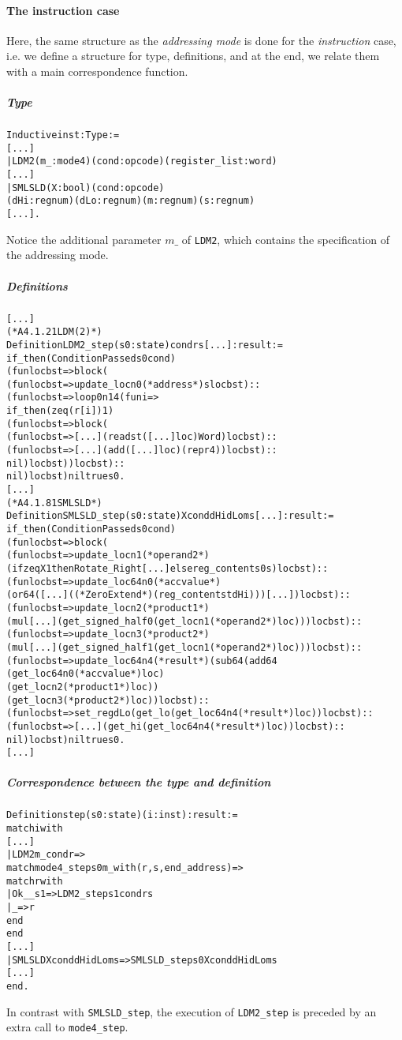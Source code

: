 \documentclass[a4paper, 11pt]{article}
\newenvironment{coq}
  {%
   \begin{alltt}
   \footnotesize} %% 8.3pl2 (April 2011)
  {\end{alltt} %
  }
\begin{document}
\paragraph{The instruction case}
Here, the same structure as the \emph{addressing mode} is done for the \emph{instruction} case, i.e. we define a structure for type, definitions, and at the end, we relate them with a main correspondence function.
  \subparagraph{Type}
\begin{coq}
Inductive inst : Type := 
[...]
  | LDM2 (m_ : mode4) (cond : opcode) (register_list : word) 
[...]
  | SMLSLD (X : bool) (cond : opcode) 
      (dHi : regnum) (dLo : regnum) (m : regnum) (s : regnum)
[...].
\end{coq}
Notice the additional parameter $m\_$ of {\tt LDM2}, which contains the specification of the addressing mode.
  \subparagraph{Definitions}
\begin{coq}
[...]
(* A4.1.21 LDM (2) *)
Definition LDM2_step (s0 : state) cond r s [...] : result :=
  if_then (ConditionPassed s0 cond)
    (fun loc b st => block (
      (fun loc b st => update_loc n0 (*address*) s loc b st) ::
      (fun loc b st => loop 0 n14 (fun i => 
        if_then (zeq (r[i]) 1)
          (fun loc b st => block (
            (fun loc b st => [...] (read st ([...] loc) Word) loc b st) ::
            (fun loc b st => [...] (add ([...] loc) (repr 4)) loc b st) ::
            nil) loc b st)) loc b st) ::
      nil) loc b st) nil true s0.
[...]
(* A4.1.81 SMLSLD *)
Definition SMLSLD_step (s0 : state) X cond dHi dLo m s [...] : result :=
  if_then (ConditionPassed s0 cond)
    (fun loc b st => block (
      (fun loc b st => update_loc n1 (*operand2*) 
        (if zeq X 1 then Rotate_Right [...] else reg_content s0 s) loc b st) ::
      (fun loc b st => update_loc64 n0 (*accvalue*) 
        (or64 ([...] ((*ZeroExtend*)(reg_content st dHi))) [...]) loc b st) ::
      (fun loc b st => update_loc n2 (*product1*) 
        (mul [...] (get_signed_half0 (get_loc n1 (*operand2*) loc))) loc b st) ::
      (fun loc b st => update_loc n3 (*product2*) 
        (mul [...] (get_signed_half1 (get_loc n1 (*operand2*) loc))) loc b st) ::
      (fun loc b st => update_loc64 n4 (*result*) (sub64 (add64 
          (get_loc64 n0 (*accvalue*) loc) 
          (get_loc n2 (*product1*) loc)) 
        (get_loc n3 (*product2*) loc)) loc b st) ::
      (fun loc b st => set_reg dLo (get_lo (get_loc64 n4 (*result*) loc)) loc b st) ::
      (fun loc b st => [...] (get_hi (get_loc64 n4 (*result*) loc)) loc b st) ::
      nil) loc b st) nil true s0.
[...]
\end{coq}
  \subparagraph{Correspondence between the type and definition}
\begin{coq}
Definition step (s0 : state) (i : inst) : result :=
  match i with
[...]
    | LDM2 m_ cond r =>
      match mode4_step s0 m_ with (r, s, end_address) =>
        match r with
          | Ok _ _ s1 => LDM2_step s1 cond r s
          | _ => r
        end
      end
[...]
    | SMLSLD X cond dHi dLo m s => SMLSLD_step s0 X cond dHi dLo m s
[...]
  end.
\end{coq}
In contrast with {\tt SMLSLD\_step}, the execution of {\tt LDM2\_step} is preceded by an extra call to {\tt mode4\_step}.
\end{document}
